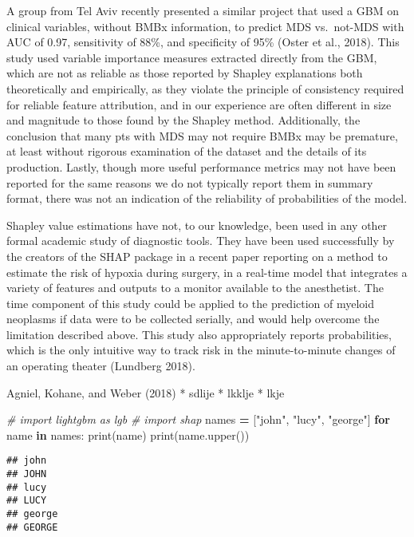 \documentclass[
]{article}
\newenvironment{Shaded}{\begin{snugshade}}{\end{snugshade}}
\newcommand{\BuiltInTok}[1]{#1}
\newcommand{\CommentTok}[1]{\textcolor[rgb]{0.56,0.35,0.01}{\textit{#1}}}
\newcommand{\ControlFlowTok}[1]{\textcolor[rgb]{0.13,0.29,0.53}{\textbf{#1}}}
\newcommand{\KeywordTok}[1]{\textcolor[rgb]{0.13,0.29,0.53}{\textbf{#1}}}
\newcommand{\NormalTok}[1]{#1}
\newcommand{\OperatorTok}[1]{\textcolor[rgb]{0.81,0.36,0.00}{\textbf{#1}}}
\newcommand{\StringTok}[1]{\textcolor[rgb]{0.31,0.60,0.02}{#1}}
\begin{document}
A group from Tel Aviv recently presented a similar project that used a
GBM on clinical variables, without BMBx information, to predict MDS
vs.~not-MDS with AUC of 0.97, sensitivity of 88\%, and specificity of
95\% (Oster et al., 2018). This study used variable importance measures
extracted directly from the GBM, which are not as reliable as those
reported by Shapley explanations both theoretically and empirically, as
they violate the principle of consistency required for reliable feature
attribution, and in our experience are often different in size and
magnitude to those found by the Shapley method. Additionally, the
conclusion that many pts with MDS may not require BMBx may be premature,
at least without rigorous examination of the dataset and the details of
its production. Lastly, though more useful performance metrics may not
have been reported for the same reasons we do not typically report them
in summary format, there was not an indication of the reliability of
probabilities of the model.

Shapley value estimations have not, to our knowledge, been used in any
other formal academic study of diagnostic tools. They have been used
successfully by the creators of the SHAP package in a recent paper
reporting on a method to estimate the risk of hypoxia during surgery, in
a real-time model that integrates a variety of features and outputs to a
monitor available to the anesthetist. The time component of this study
could be applied to the prediction of myeloid neoplasms if data were to
be collected serially, and would help overcome the limitation described
above. This study also appropriately reports probabilities, which is the
only intuitive way to track risk in the minute-to-minute changes of an
operating theater (Lundberg 2018).

Agniel, Kohane, and Weber (2018) * sdlije * lkklje * lkje

\begin{Shaded}
\begin{Highlighting}[]
\CommentTok{\# import lightgbm as lgb}
\CommentTok{\# import shap}
\NormalTok{names }\OperatorTok{=}\NormalTok{ [}\StringTok{"john"}\NormalTok{, }\StringTok{"lucy"}\NormalTok{, }\StringTok{"george"}\NormalTok{]}
\ControlFlowTok{for}\NormalTok{ name }\KeywordTok{in}\NormalTok{ names:}
    \BuiltInTok{print}\NormalTok{(name)}
    \BuiltInTok{print}\NormalTok{(name.upper())}
\end{Highlighting}
\end{Shaded}

\begin{verbatim}
## john
## JOHN
## lucy
## LUCY
## george
## GEORGE
\end{verbatim}
\end{document}
